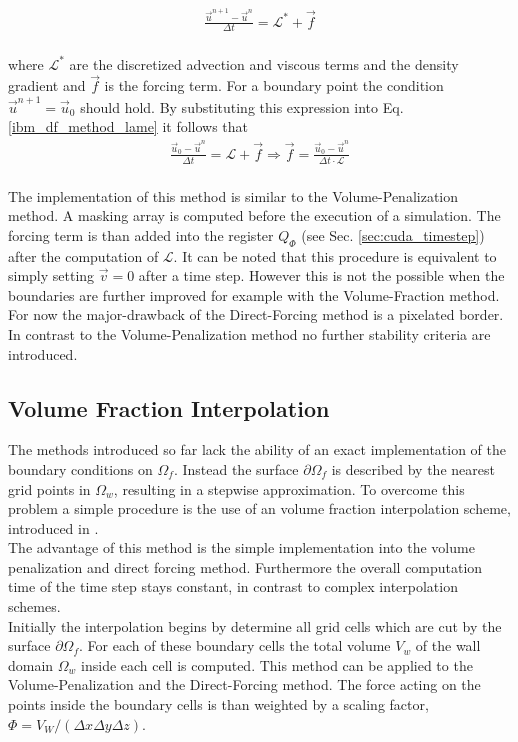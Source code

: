 \begin{align}
    \label{ibm_df_method_lame}
    \frac{\vec{u}^{n+1} -\vec{u}^n}{\Delta t} = \mathscr{L}^* + \vec{f}\\
\end{align}

where $\mathscr{L^*}$ are the discretized advection and viscous terms and the density gradient and $\vec{f}$ is the forcing term.
For a boundary point the condition $\vec{u}^{n+1} = \vec{u}_0$ should hold.
By substituting this expression into Eq. \ref{ibm_df_method_lame} it follows that
\begin{align}
    \frac{\vec{u}_0 -\vec{u}^n}{\Delta t} = \mathscr{L} + \vec{f} \Rightarrow \vec{f} = \frac{\vec{u}_0 -\vec{u}^n}{\Delta t\cdot \mathscr{L}}\\
\end{align}

The implementation of this method is similar to the Volume-Penalization method.
A masking array is computed before the execution of a simulation.
The forcing term is than added into the register $Q_\Phi$ (see Sec. \ref{sec:cuda_timestep}) after the computation of $\mathscr{L}$.
It can be noted that this procedure is equivalent to simply setting $\vec{v}=0$ after a time step.
However this is not the possible when the boundaries are further improved for example with the Volume-Fraction method.
For now the major-drawback of the Direct-Forcing method is a pixelated border.
In contrast to the Volume-Penalization method no further stability criteria are introduced.

\subsection{Volume Fraction Interpolation}

The methods introduced so far lack the ability of an exact implementation of the boundary conditions on $\Omega_f$.
Instead the surface $\partial \Omega_f$ is described by the nearest grid points in $\Omega_w$, resulting in a
stepwise approximation.
To overcome this problem a simple procedure is the use of an volume fraction interpolation scheme, introduced in \citep{Fadlun2000}.\\
The advantage of this method is the simple implementation into the volume penalization and direct forcing method.
Furthermore the overall computation time of the time step stays constant, in  contrast to complex interpolation schemes.\\
Initially the interpolation begins by determine all grid cells which are cut by the surface $\partial \Omega_f$.
For each of these boundary cells the total volume $V_w$ of the wall domain $\Omega_w$ inside each cell is computed.
This method can be applied to the Volume-Penalization and the Direct-Forcing method.
The force acting on the points inside the boundary cells is than weighted by a scaling factor, $\Phi = V_W/(\Delta x \Delta y \Delta z)$.

